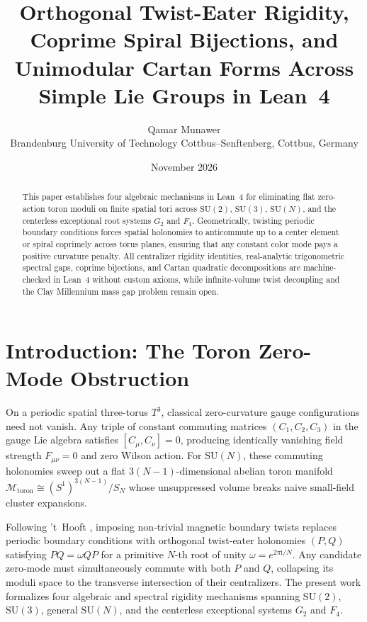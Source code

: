 \documentclass[11pt,a4paper]{article}
\title{Orthogonal Twist-Eater Rigidity, Coprime Spiral Bijections, and Unimodular Cartan Forms Across Simple Lie Groups in Lean~4}
\author{Qamar Munawer \\ \small Brandenburg University of Technology Cottbus--Senftenberg, Cottbus, Germany}
\date{November 2026}
\newcommand{\SU}{\mathrm{SU}}
\begin{document}
\maketitle

\begin{abstract}
This paper establishes four algebraic mechanisms in Lean~4 for eliminating flat zero-action toron moduli on finite spatial tori across $\SU(2)$, $\SU(3)$, $\SU(N)$, and the centerless exceptional root systems $G_2$ and $F_4$. Geometrically, twisting periodic boundary conditions forces spatial holonomies to anticommute up to a center element or spiral coprimely across torus planes, ensuring that any constant color mode pays a positive curvature penalty. All centralizer rigidity identities, real-analytic trigonometric spectral gaps, coprime bijections, and Cartan quadratic decompositions are machine-checked in Lean~4 without custom axioms, while infinite-volume twist decoupling and the Clay Millennium mass gap problem remain open.
\end{abstract}

\section{Introduction: The Toron Zero-Mode Obstruction}
On a periodic spatial three-torus $T^3$, classical zero-curvature gauge configurations need not vanish. Any triple of constant commuting matrices $(C_1, C_2, C_3)$ in the gauge Lie algebra satisfies $[C_\mu, C_\nu] = 0$, producing identically vanishing field strength $F_{\mu\nu} = 0$ and zero Wilson action. For $\SU(N)$, these commuting holonomies sweep out a flat $3(N-1)$-dimensional abelian toron manifold $\mathcal{M}_{\mathrm{toron}} \cong (S^1)^{3(N-1)} / S_N$ whose unsuppressed volume breaks naive small-field cluster expansions.

Following 't~Hooft \cite{tHooft1979}, imposing non-trivial magnetic boundary twists replaces periodic boundary conditions with orthogonal twist-eater holonomies $(P, Q)$ satisfying $PQ = \omega QP$ for a primitive $N$-th root of unity $\omega = e^{2\pi \mathrm{i} / N}$. Any candidate zero-mode must simultaneously commute with both $P$ and $Q$, collapsing its moduli space to the transverse intersection of their centralizers. The present work formalizes four algebraic and spectral rigidity mechanisms spanning $\SU(2)$, $\SU(3)$, general $\SU(N)$, and the centerless exceptional systems $G_2$ and $F_4$.
\end{document}
